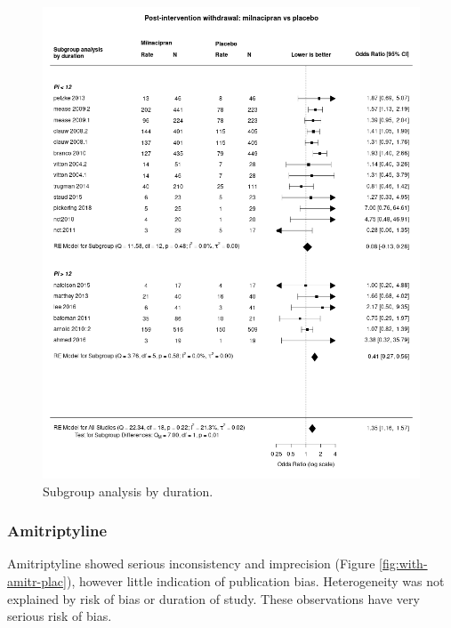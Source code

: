 \documentclass{report}\usepackage[]{graphicx}\usepackage[]{color}
\begin{document}
\begin{figure}
\includegraphics[width=\textwidth]{img/withdrawal-duration-milnacipran-placebo-forest.png}
\caption[Withdrawal duration: milnacipran]{
Subgroup analysis by duration.
}
\label{fig:withdrawal-duration-milna-plac}
\end{figure}

\subsubsection{Amitriptyline}

Amitriptyline showed serious inconsistency and imprecision (Figure \ref{fig:with-amitr-plac}), however little indication of publication bias. Heterogeneity was not explained by risk of bias or duration of study. These observations have very serious risk of bias.
\end{document}

